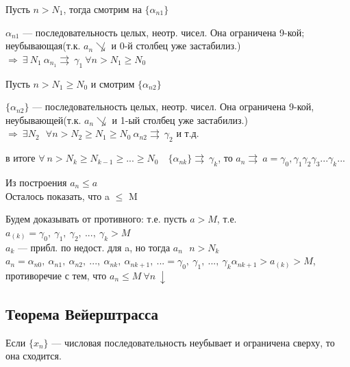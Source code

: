 \documentclass{article}
\begin{document}
    Пусть \(n > N_1\), тогда смотрим на \(\{\alpha_{n1}\}\)

    \(\alpha_{n1}\) --- последовательность целых, неотр. чисел. Она ограничена 9-кой; неубывающая(т.к. \(a_n \not\searrow\) и 0-й столбец уже застабилиз.) \(\Rightarrow \ \exists\ N_1 \ \alpha_{n_1} \rightrightarrows\ \gamma_1 \ \forall n > N_1 \geq N_0\)

    Пусть \( n > N_1 \geq N_0 \) и смотрим \( \{ \alpha_{n2} \} \)
    
    \(\{\alpha_{n2}\}\) --- последовательность целых, неотр. чисел. Она ограничена 9-кой, неубывающей(т.к. \(a_n \not\searrow\) и 1-ый столбец уже застабилиз.) \(\Rightarrow \ \exists N_2 \ \: \ \forall n > N_2 \geq N_1 \geq N_0 \ \alpha_{n2} \rightrightarrows\ \gamma_2\) и т.д.

    в итоге \( \forall\ n > N_k \geq N_{k-1} \geq ... \geq N_0\quad \{ \alpha_{nk} \} \rightrightarrows\ \gamma_k \), то \( a_n \rightrightarrows\ a = \gamma_0,\gamma_1\gamma_2\gamma_3...\gamma_k... \)
    
    Из построения \(a_n \leq a \)
    \\ Осталось показать, что a \(\leq\) M

    Будем доказывать от противного: т.е. пусть \(a > M\), т.е. \(a_{(k)} = \gamma_0,\ \gamma_1,\ \gamma_2,\ ...,\ \gamma_k > M\)
    \\ \(a_k\) --- прибл. по недост. для a, но тогда \(a_n \ \: \ n > N_k\)
    \\ \(a_n = \alpha_{n0},\ \alpha_{n1},\ \alpha_{n2},\ ...,\ \alpha_{nk},\ \alpha_{nk+1},\ ... = \gamma_0,\ \gamma_1,\ ...,\ \gamma_k\alpha_{nk+1} > a_{(k)} > M\), противоречие с тем, что \(a_n \leq M \ \forall n \ \downarrow\)
    
    \subsection{Теорема Вейерштрасса}
    
    Если \(\{ x_n \} \) --- числовая последовательность неубывает и ограничена сверху, то она сходится.
\end{document}
